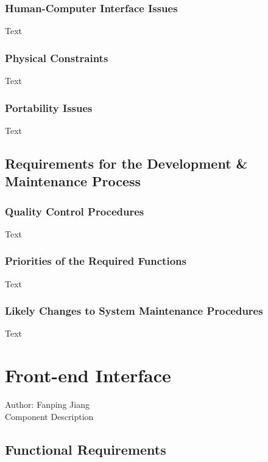 \documentclass[12pt]{article}
\begin{document}
\subsubsection {Human-Computer Interface Issues}

Text

\subsubsection {Physical Constraints}

Text

\subsubsection {Portability Issues}

Text

\subsection{Requirements for the Development \& Maintenance Process}

\subsubsection {Quality Control Procedures}

Text

\subsubsection {Priorities of the Required Functions}

Text

\subsubsection {Likely Changes to System Maintenance Procedures}

Text

\section{Front-end Interface}
Author: Fanping Jiang\\

\noindent Component Description

\subsection{Functional Requirements}
\end{document}
